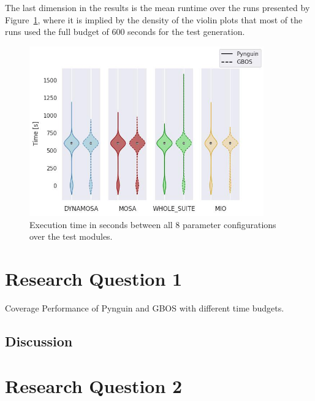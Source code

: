 \documentclass[%
  chapterprefix=false,%
  open=right,%
  twoside=true,%
  paper=a4,%
  logofile={Figures/logo.png},%
  thesistype=master,%
  UKenglish,%
]{se2thesis}
\begin{document}
The last dimension in the results is the mean runtime over the runs presented by Figure~\ref{fig:time}, where it is implied by the density of the violin plots that most of the runs used the full budget of 600 seconds for the test generation.

\begin{figure}[bth]
  \centering
  \includegraphics[width=0.9\textwidth]{Figures/Results/TotalTime.jpg}
  \caption{Execution time in seconds between all 8 parameter configurations over the test modules.}\label{fig:time}
\end{figure}

\section{Research Question 1}

\begin{table}[bth]
  \centering
  
  \centering
  
  \centering
  
  \caption{Coverage Performance of Pynguin and GBOS with different time budgets.}
\end{table}



\subsection*{Discussion} 

\section{Research Question 2}
\end{document}
